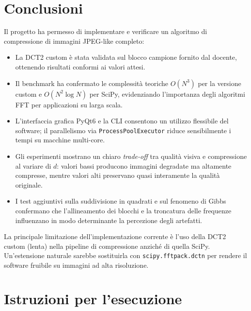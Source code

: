 \documentclass[12pt,a4paper]{article}
\begin{document}
\section{Conclusioni}

Il progetto ha permesso di implementare e verificare un algoritmo di
compressione di immagini JPEG-like completo:

\begin{itemize}
  \item La DCT2 custom è stata validata sul blocco campione fornito dal
        docente, ottenendo risultati conformi ai valori attesi.
  \item Il benchmark ha confermato le complessità teoriche $O(N^3)$ per la
        versione custom e $O(N^2 \log N)$ per SciPy, evidenziando l'importanza
        degli algoritmi FFT per applicazioni su larga scala.
  \item L'interfaccia grafica PyQt6 e la CLI consentono un utilizzo flessibile
        del software; il parallelismo via \texttt{ProcessPoolExecutor} riduce
        sensibilmente i tempi su macchine multi-core.
  \item Gli esperimenti mostrano un chiaro \emph{trade-off} tra qualità visiva
        e compressione al variare di $d$: valori bassi producono immagini
        degradate ma altamente compresse, mentre valori alti preservano quasi
        interamente la qualità originale.
  \item I test aggiuntivi sulla suddivisione in quadrati e sul fenomeno di Gibbs
        confermano che l'allineamento dei blocchi e la troncatura delle
        frequenze influenzano in modo determinante la percezione degli artefatti.
\end{itemize}

La principale limitazione dell'implementazione corrente è l'uso della DCT2
custom (lenta) nella pipeline di compressione anziché di quella SciPy.
Un'estensione naturale sarebbe sostituirla con \texttt{scipy.fftpack.dctn}
per rendere il software fruibile su immagini ad alta risoluzione.

\appendix
\section{Istruzioni per l'esecuzione}
\end{document}
